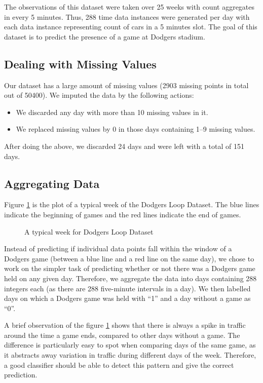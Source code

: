 \documentclass[conference]{IEEEtran}
\begin{document}
		The observations of this dataset were taken over 25 weeks with count aggregates in every 5 minutes. Thus, 288 time data instances were generated per day with each data instance representing count of cars in a 5 minutes slot. The goal of this dataset is to predict the presence of a  game at Dodgers stadium. 
		
		\subsection{Dealing with Missing Values}
		\label{sec:missing-values}
		
		Our dataset has a large amount of missing values (2903 missing points in total out of 50400). We imputed the data by the following actions:
		\begin{itemize}
			\item We discarded any day with more than 10 missing values in it.
			\item We replaced missing values by 0 in those days containing 1--9 missing values.
		\end{itemize}
		After doing the above, we discarded 24 days and were left with a total of 151 days. 
		
		\subsection{Aggregating Data}
		
		Figure \ref{fig:typical-week} is the plot of a typical week of the Dodgers Loop Dataset. The blue lines indicate the beginning of games and the red lines indicate the end of games. 
		
		\begin{figure}[H]
			\centering
			\caption{A typical week for Dodgers Loop Dataset}
			\label{fig:typical-week}
		\end{figure}
		
		Instead of predicting if individual data points fall within the window of a Dodgers game (between a blue line and a red line on the same day), we chose to work on the simpler task of predicting whether or not there was a Dodgers game held on any given day.
		Therefore, we aggregate the data into days containing 288 integers each (as there are 288 five-minute intervals in a day). We then labelled days on which a Dodgers game was held with ``1'' and a day without a game as ``0''. 
		
		A brief observation of the figure \ref{fig:typical-week} shows that there is always a spike in traffic around the time a game ends, compared to other days without a game. The difference is particularly easy to spot when comparing days of the same game, as it abstracts away variation in traffic during different days of the week. Therefore, a good classifier should be able to detect this pattern and give the correct prediction.
		
\end{document}
